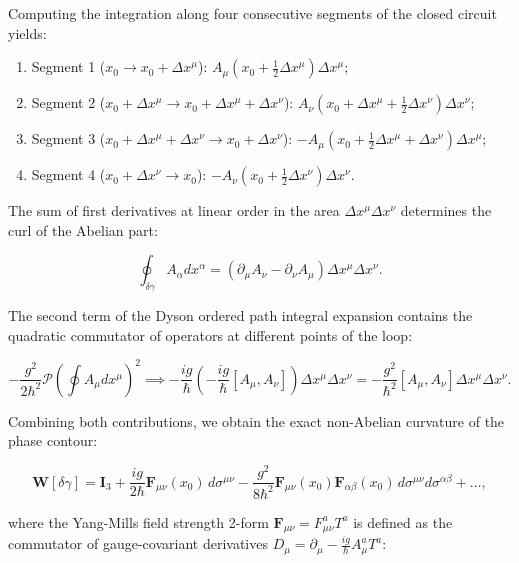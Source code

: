 Computing the integration along four consecutive segments of the closed circuit yields:
\begin{enumerate}
\item Segment 1 ($x_0 \to x_0 + \Delta x^\mu$): $A_\mu(x_0 + \frac{1}{2}\Delta x^\mu) \Delta x^\mu$;
\item Segment 2 ($x_0 + \Delta x^\mu \to x_0 + \Delta x^\mu + \Delta x^\nu$): $A_\nu(x_0 + \Delta x^\mu + \frac{1}{2}\Delta x^\nu) \Delta x^\nu$;
\item Segment 3 ($x_0 + \Delta x^\mu + \Delta x^\nu \to x_0 + \Delta x^\nu$): $- A_\mu(x_0 + \frac{1}{2}\Delta x^\mu + \Delta x^\nu) \Delta x^\mu$;
\item Segment 4 ($x_0 + \Delta x^\nu \to x_0$): $- A_\nu(x_0 + \frac{1}{2}\Delta x^\nu) \Delta x^\nu$.
\end{enumerate}

The sum of first derivatives at linear order in the area $\Delta x^\mu \Delta x^\nu$ determines the curl of the Abelian part:

\begin{equation}\label{eq:2.3.8}\tag{2.3.8}
\oint_{\delta\gamma} A_\alpha dx^\alpha = \left( \partial_\mu A_\nu - \partial_\nu A_\mu \right) \Delta x^\mu \Delta x^\nu.
\end{equation}

The second term of the Dyson ordered path integral expansion contains the quadratic commutator of operators at different points of the loop:

\begin{equation}\label{eq:2.3.9}\tag{2.3.9}
- \frac{g^2}{2\hbar^2} \mathcal{P} \left( \oint A_\mu dx^\mu \right)^2 \implies - \frac{ig}{\hbar} \left( - \frac{ig}{\hbar} [A_\mu, A_\nu] \right) \Delta x^\mu \Delta x^\nu = - \frac{g^2}{\hbar^2} [A_\mu, A_\nu] \Delta x^\mu \Delta x^\nu.
\end{equation}

Combining both contributions, we obtain the exact non-Abelian curvature of the phase contour:

\begin{equation}\label{eq:2.3.10}\tag{2.3.10}
\mathbf{W}[\delta\gamma] = \mathbf{I}_3 + \frac{ig}{2\hbar} \mathbf{F}_{\mu\nu}(x_0) \, d\sigma^{\mu\nu} - \frac{g^2}{8\hbar^2} \mathbf{F}_{\mu\nu}(x_0) \mathbf{F}_{\alpha\beta}(x_0) \, d\sigma^{\mu\nu} d\sigma^{\alpha\beta} + \dots,
\end{equation}

where the Yang-Mills field strength 2-form $\mathbf{F}_{\mu\nu} = F_{\mu\nu}^a T^a$ is defined as the commutator of gauge-covariant derivatives $D_\mu = \partial_\mu - \frac{ig}{\hbar} A_\mu^a T^a$:

